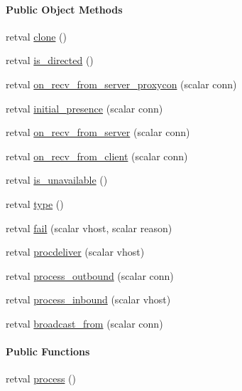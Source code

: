 \begin{Indent}\paragraph*{\-Public \-Object \-Methods}
\begin{DoxyCompactItemize}
\item 
retval \hyperlink{class_d_jabberd_1_1_presence_aeae5c5f1cea1b8dce4cef8869c3ddcc8}{clone} ()
\item 
retval \hyperlink{class_d_jabberd_1_1_presence_abb36862366c272f2e56e422bdf6d4086}{is\-\_\-directed} ()
\item 
retval \hyperlink{class_d_jabberd_1_1_presence_a75ba07e9ca8311c9111bfab762b80e4e}{on\-\_\-recv\-\_\-from\-\_\-server\-\_\-proxycon} (scalar conn)
\item 
retval \hyperlink{class_d_jabberd_1_1_presence_a787086b43159c09dd9ffde4cd05da91d}{initial\-\_\-presence} (scalar conn)
\item 
retval \hyperlink{class_d_jabberd_1_1_presence_ad3c4c11657fd6d051400183115faade3}{on\-\_\-recv\-\_\-from\-\_\-server} (scalar conn)
\item 
retval \hyperlink{class_d_jabberd_1_1_presence_ae63682df867d9a59ae7096b94a14aeef}{on\-\_\-recv\-\_\-from\-\_\-client} (scalar conn)
\item 
retval \hyperlink{class_d_jabberd_1_1_presence_a0802563900c0a904b98be5d5dcd3d907}{is\-\_\-unavailable} ()
\item 
retval \hyperlink{class_d_jabberd_1_1_presence_a1ee695e90037649e9b1f252275b6ac18}{type} ()
\item 
retval \hyperlink{class_d_jabberd_1_1_presence_a4fffa2e27fed6b6ff0a0efc50a815224}{fail} (scalar vhost, scalar reason)
\item 
retval \hyperlink{class_d_jabberd_1_1_presence_a668da0a35743aa142c11dbefdc8df874}{procdeliver} (scalar vhost)
\item 
retval \hyperlink{class_d_jabberd_1_1_presence_a6bc6834542ff66318e141a1135464d66}{process\-\_\-outbound} (scalar conn)
\item 
retval \hyperlink{class_d_jabberd_1_1_presence_a254b65560e7678b40a6232588f508795}{process\-\_\-inbound} (scalar vhost)
\item 
retval \hyperlink{class_d_jabberd_1_1_presence_a3499825423fc6005701d41bcdc270ce3}{broadcast\-\_\-from} (scalar conn)
\end{DoxyCompactItemize}
\end{Indent}
\begin{Indent}\paragraph*{\-Public \-Functions}
\begin{DoxyCompactItemize}
\item 
retval \hyperlink{class_d_jabberd_1_1_presence_a360fbe0fa097f59afa301e7c3901a6cc}{process} ()
\end{DoxyCompactItemize}
\end{Indent}
